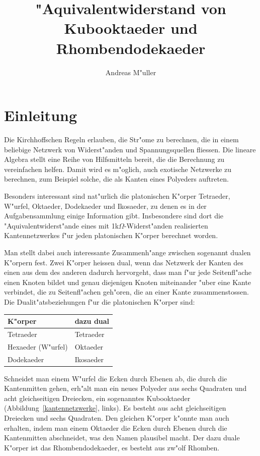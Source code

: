 \documentclass[a4paper,12pt]{article}
\begin{document}
\title{"Aquivalentwiderstand von Kubooktaeder und Rhombendodekaeder}
\author{Andreas M"uller}
\date{}
\maketitle
\section{Einleitung}
Die Kirchhoffschen Regeln erlauben, die Str"ome zu berechnen,
die in einem beliebige Netzwerk von Widerst"anden und Spannungsquellen fliessen.
Die lineare Algebra stellt eine Reihe von Hilfsmitteln bereit, die
die Berechnung zu vereinfachen helfen.
Damit wird es m"oglich, auch exotische Netzwerke zu berechnen, zum Beispiel
solche, die als Kanten eines Polyeders auftreten.

Besonders interessant sind nat"urlich die platonischen K"orper Tetraeder,
W"urfel, Oktaeder, Dodekaeder und Ikosaeder, zu denen es in der
Aufgabensammlung einige Information gibt.
Insbesondere sind dort die "Aquivalentwiderst"ande eines mit
1k$\Omega$-Widerst"anden realisierten Kantennetzwerkes f"ur jeden 
platonischen K"orper berechnet worden.

Man stellt dabei auch interessante Zusammenh"ange zwischen sogenannt dualen
K"orpern fest.
Zwei K"orper heissen dual, wenn das Netzwerk der Kanten des einen aus dem
des anderen dadurch hervorgeht, dass man f"ur jede Seitenfl"ache einen
Knoten bildet und genau diejenigen Knoten miteinander "uber eine Kante
verbindet, die zu Seitenfl"achen geh"oren, die an einer Kante zusammenstossen.
Die Dualit"atsbeziehungen f"ur die platonischen K"orper sind:
\begin{center}
\begin{tabular}{ll}
\hline
K"orper&dazu dual\\
\hline
Tetraeder&Tetraeder\\
Hexaeder (W"urfel)&Oktaeder\\
Dodekaeder&Ikosaeder\\
\hline
\end{tabular}
\end{center}

Schneidet man einem W"urfel die Ecken durch Ebenen ab, die durch die
Kantenmitten gehen, erh"alt man ein neues Polyeder aus sechs Quadraten
und acht gleichseitigen Dreiecken, ein sogenanntes Kubooktaeder
(Abbildung~\ref{kantennetzwerke}, links).
Es besteht aus acht gleichseitigen Dreiecken und sechs Quadraten.
Den gleichen K"orper k"onnte man auch erhalten, indem man einem Oktaeder
die Ecken durch Ebenen durch die Kantenmitten abschneidet,
was den Namen plausibel macht.
Der dazu duale K"orper ist das Rhombendodekaeder, es besteht aus zw"olf Rhomben.
\end{document}
